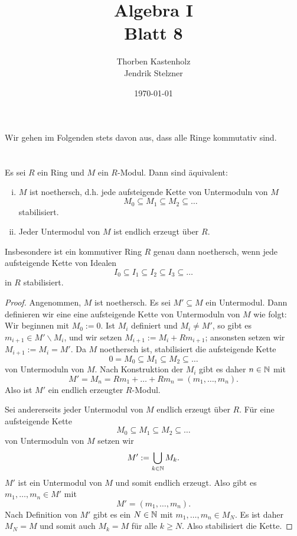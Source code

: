 \documentclass[a4paper,10pt]{article}
\title{\sc Algebra I \\ \Large Blatt 8}
\author{Thorben Kastenholz \\ Jendrik Stelzner}
\date{\today}
\begin{document}
\maketitle





Wir gehen im Folgenden stets davon aus, dass alle Ringe kommutativ sind.





\section{}

\begin{lem}\label{lem: Äquivalente Definitionen von noethersch}
 Es sei $R$ ein Ring und $M$ ein $R$-Modul. Dann sind äquivalent:
 \begin{enumerate}[i)]
  \item $M$ ist noethersch, d.h. jede aufsteigende Kette von Untermoduln von $M$
  \[
   M_0 \subseteq M_1 \subseteq M_2 \subseteq \ldots
  \]
  stabilisiert.
  \item Jeder Untermodul von $M$ ist endlich erzeugt über $R$.
 \end{enumerate}
 Insbesondere ist ein kommutiver Ring $R$ genau dann noethersch, wenn jede aufsteigende Kette von Idealen
 \[
  I_0 \subseteq I_1 \subseteq I_2 \subseteq I_3 \subseteq \ldots
 \]
 in $R$ stabilisiert.
\end{lem}
\begin{proof}
 Angenommen, $M$ ist noethersch. Es sei $M' \subseteq M$ ein Untermodul. Dann definieren wir eine eine aufsteigende Kette von Untermoduln von $M$ wie folgt: Wir beginnen mit $M_0 := 0$. Ist $M_i$ definiert und $M_i \neq M'$, so gibt es $m_{i+1} \in M' \smallsetminus M_i$, und wir setzen $M_{i+1} := M_i + R m_{i+1}$; ansonsten setzen wir $M_{i+1} := M_i = M'$. Da $M$ noethersch ist, stabilisiert die aufsteigende Kette
 \[
  0 = M_0 \subseteq M_1 \subseteq M_2 \subseteq \ldots
 \]
 von Untermoduln von $M$. Nach Konstruktion der $M_i$ gibt es daher $n \in \mathbb{N}$ mit
 \[
  M' = M_n = Rm_1 + \ldots + Rm_n = (m_1, \ldots, m_n).
 \]
 Also ist $M'$ ein endlich erzeugter $R$-Modul.
 
 Sei andererseits jeder Untermodul von $M$ endlich erzeugt über $R$. Für eine aufsteigende Kette
 \[
  M_0 \subseteq M_1 \subseteq M_2 \subseteq \ldots
 \]
 von Untermoduln von $M$ setzen wir
 \[
  M' := \bigcup_{k \in \mathbb{N}} M_k.
 \]
 $M'$ ist ein Untermodul von $M$ und somit endlich erzeugt. Also gibt es $m_1, \ldots, m_n \in M'$ mit
 \[
  M' = (m_1, \ldots, m_n).
 \]
 Nach Definition von $M'$ gibt es ein $N \in \mathbb{N}$ mit $m_1, \ldots, m_n \in M_N$. Es ist daher $M_N = M$ und somit auch $M_k = M$ für alle $k \geq N$. Also stabilisiert die Kette.
\end{proof}
\end{document}
